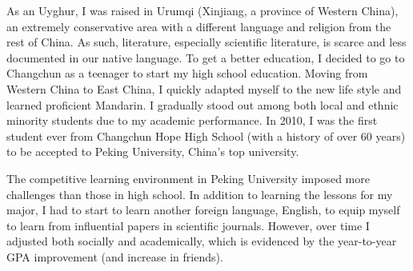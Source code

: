 

% 
% 
%  



As an Uyghur, I was raised in Urumqi (Xinjiang, a province of Western China), an extremely conservative area with a different language and religion from the rest of China. As such, literature, especially scientific literature, is scarce and less documented in our native language. To get a better education, I decided to go to Changchun as a teenager to start my high school education.  Moving from Western China to East China, I quickly adapted myself to the new life style and learned proficient Mandarin. I gradually stood out among both local and ethnic minority students due to my academic performance. In 2010, I was the first student ever from Changchun Hope High School (with a history of over 60 years) to be accepted to Peking University, China's top university. 

\setlength{\parindent}{15pt} %

The competitive learning environment in Peking University imposed more challenges than those in high school. In addition to learning the lessons for my major, I had to start to learn another foreign language, English, to equip myself to learn from influential papers in scientific journals. However, over time I adjusted both socially and academically, which is evidenced by the year-to-year GPA improvement (and increase in friends).

